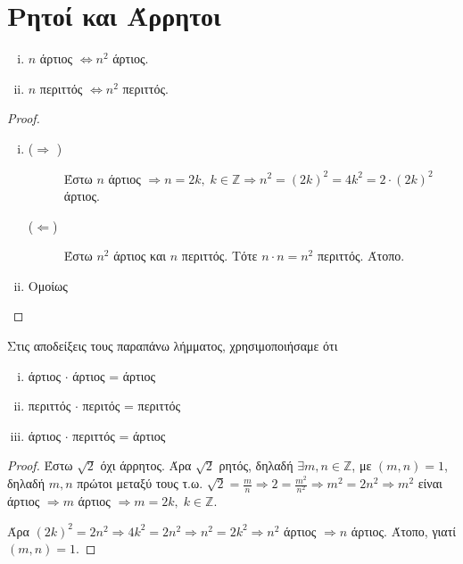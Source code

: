 \documentclass[main.tex]{subfiles}
\begin{document}
\section{Ρητοί και Άρρητοι}

\begin{lem}
\item {}
    \begin{enumerate}[i)]
        \item $n$ άρτιος $ \Leftrightarrow n^{2} $ άρτιος.
        \item $ n $ περιττός $ \Leftrightarrow n^{2} $ περιττός.
    \end{enumerate}
\end{lem}

\begin{proof}
\item {}
    \begin{enumerate}[i)]
        \item 
            \begin{description}
                \item [($ \Rightarrow $ )] 
                    Έστω $ n $ άρτιος $ \Rightarrow n =2k, \; k \in \mathbb{Z} 
                    \Rightarrow n^{2} = (2k)^{2} = 4k^{2} = 2\cdot (2k)^{2} $ άρτιος. 
                \item [($ \Leftarrow $)] Έστω $ n^{2} $ άρτιος και $n$ περιττός. Τότε 
                    $ n \cdot n = n^{2} $ περιττός. Άτοπο.
            \end{description}

        \item Ομοίως
    \end{enumerate}
\end{proof}

\begin{rem}
    Στις αποδείξεις τους παραπάνω λήμματος, χρησιμοποιήσαμε ότι 
    \begin{enumerate}[i)]
        \item άρτιος $ \cdot $ άρτιος = άρτιος
        \item περιττός $ \cdot $ περιτός = περιττός
        \item άρτιος $ \cdot $ περιττός = άρτιος
    \end{enumerate}
\end{rem}


\begin{proof}
    Έστω $ \sqrt{2} $ όχι άρρητος. Άρα $ \sqrt{2} $ ρητός, δηλαδή $ \exists m,n 
    \in \mathbb{Z} $, με $ (m,n)=1 $, δηλαδή $ m,n $ πρώτοι μεταξύ τους
    τ.ω. $ \sqrt{2} = \frac{m}{n} \Rightarrow 2 = \frac{m^{2}}{n^{2}} \Rightarrow 
    m^{2} = 2n^{2} \Rightarrow m^{2}$ είναι άρτιος $ \Rightarrow m $ άρτιος 
    $ \Rightarrow m = 2k, \; k \in \mathbb{Z}$. 

    Άρα $ (2k)^{2} = 2n^{2} \Rightarrow 4k^{2}=2n^{2} \Rightarrow n^{2} = 2k^{2} 
    \Rightarrow n^{2} $ άρτιος $ \Rightarrow n $ άρτιος. Άτοπο, γιατί $ (m,n)=1 $.
\end{proof}
\end{document}
